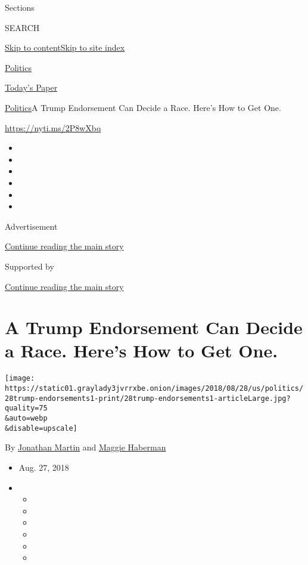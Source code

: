 Sections

SEARCH

\protect\hyperlink{site-content}{Skip to
content}\protect\hyperlink{site-index}{Skip to site index}

\href{https://www.nytimes3xbfgragh.onion/section/politics}{Politics}

\href{https://myaccount.nytimes3xbfgragh.onion/auth/login?response_type=cookie\&client_id=vi}{}

\href{https://www.nytimes3xbfgragh.onion/section/todayspaper}{Today's
Paper}

\href{/section/politics}{Politics}\textbar{}A Trump Endorsement Can
Decide a Race. Here's How to Get One.

\url{https://nyti.ms/2P8wXbq}

\begin{itemize}
\item
\item
\item
\item
\item
\item
\end{itemize}

Advertisement

\protect\hyperlink{after-top}{Continue reading the main story}

Supported by

\protect\hyperlink{after-sponsor}{Continue reading the main story}

\hypertarget{a-trump-endorsement-can-decide-a-race-heres-how-to-get-one}{%
\section{A Trump Endorsement Can Decide a Race. Here's How to Get
One.}\label{a-trump-endorsement-can-decide-a-race-heres-how-to-get-one}}

\texttt{[image: https://static01.graylady3jvrrxbe.onion/images/2018/08/28/us/politics/28trump-endorsements1-print/28trump-endorsements1-articleLarge.jpg?quality=75\\\&auto=webp\\\&disable=upscale]}

By \href{https://www.nytimes3xbfgragh.onion/by/jonathan-martin}{Jonathan
Martin} and
\href{https://www.nytimes3xbfgragh.onion/by/maggie-haberman}{Maggie
Haberman}

\begin{itemize}
\item
  Aug. 27, 2018
\item
  \begin{itemize}
  \item
  \item
  \item
  \item
  \item
  \item
  \end{itemize}
\end{itemize}

